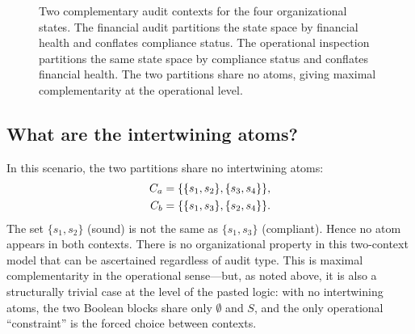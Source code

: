 \documentclass[aps,pra,twocolumn,superscriptaddress,floatfix,longbibliography]{revtex4-2}
\begin{document}
\begin{figure}[t]
\centering
{}
\caption{Two complementary audit contexts for the four organizational
states. The financial audit partitions the state space by financial
health and conflates compliance status. The operational inspection
partitions the same state space by compliance status and conflates
financial health. The two partitions share no atoms, giving maximal
complementarity at the operational level.}
\label{fig:org_grid}
\end{figure}

\subsection{What are the intertwining atoms?}

In this scenario, the two partitions share no intertwining atoms:
\begin{align}
C_a &= \{\{s_1,s_2\},\{s_3,s_4\}\},
\notag\\
C_b &= \{\{s_1,s_3\},\{s_2,s_4\}\}.
\label{eq:org}
\end{align}
The set $\{s_1,s_2\}$ (sound) is not the same as
$\{s_1,s_3\}$ (compliant). Hence no atom appears in both contexts.
There is no organizational property in this two-context model that
can be ascertained regardless of audit type. This is maximal
complementarity in the operational sense---but, as noted above, it
is also a structurally trivial case at the level of the pasted
logic: with no intertwining atoms, the two Boolean blocks share only
$\emptyset$ and $S$, and the only operational ``constraint'' is the
forced choice between contexts.
\end{document}
